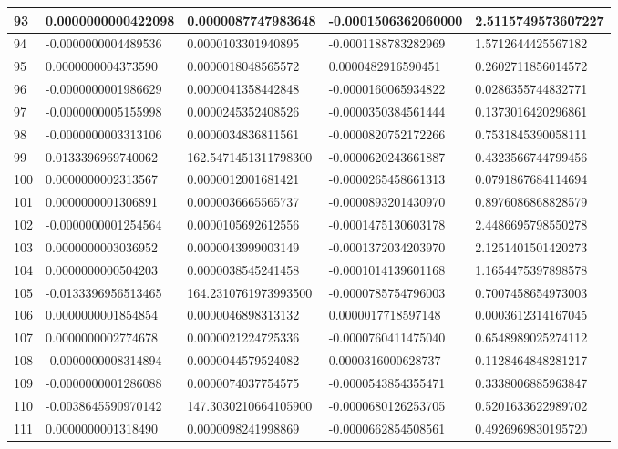 \begin{center}
\begin{longtable}{|p{0.5cm}|p{3.5cm}|p{3.5cm}|p{3.5cm}|p{3.5cm}|}
\hline
93  & 0.0000000000422098  & 0.0000087747983648  & -0.0001506362060000  & 2.5115749573607227\\
\hline
94  & -0.0000000004489536  & 0.0000103301940895  & -0.0001188783282969  & 1.5712644425567182\\
\hline
95  & 0.0000000004373590  & 0.0000018048565572  & 0.0000482916590451  & 0.2602711856014572\\
\hline
96  & -0.0000000001986629  & 0.0000041358442848  & -0.0000160065934822  & 0.0286355744832771\\
\hline
97  & -0.0000000005155998  & 0.0000245352408526  & -0.0000350384561444  & 0.1373016420296861\\
\hline
98  & -0.0000000003313106  & 0.0000034836811561  & -0.0000820752172266  & 0.7531845390058111\\
\hline
99  & 0.0133396969740062  & 162.5471451311798300  & -0.0000620243661887  & 0.4323566744799456\\
\hline
100  & 0.0000000002313567  & 0.0000012001681421  & -0.0000265458661313  & 0.0791867684114694\\
\hline
101  & 0.0000000001306891  & 0.0000036665565737  & -0.0000893201430970  & 0.8976086868828579\\
\hline
102  & -0.0000000001254564  & 0.0000105692612556  & -0.0001475130603178  & 2.4486695798550278\\
\hline
103  & 0.0000000003036952  & 0.0000043999003149  & -0.0001372034203970  & 2.1251401501420273\\
\hline
104  & 0.0000000000504203  & 0.0000038545241458  & -0.0001014139601168  & 1.1654475397898578\\
\hline
105  & -0.0133396956513465  & 164.2310761973993500  & -0.0000785754796003  & 0.7007458654973003\\
\hline
106  & 0.0000000001854854  & 0.0000046898313132  & 0.0000017718597148  & 0.0003612314167045\\
\hline
107  & 0.0000000002774678  & 0.0000021224725336  & -0.0000760411475040  & 0.6548989025274112\\
\hline
108  & -0.0000000008314894  & 0.0000044579524082  & 0.0000316000628737  & 0.1128464848281217\\
\hline
109  & -0.0000000001286088  & 0.0000074037754575  & -0.0000543854355471  & 0.3338006885963847\\
\hline
110  & -0.0038645590970142  & 147.3030210664105900  & -0.0000680126253705  & 0.5201633622989702\\
\hline
111  & 0.0000000001318490  & 0.0000098241998869  & -0.0000662854508561  & 0.4926969830195720\\

\end{longtable}
\end{center}
